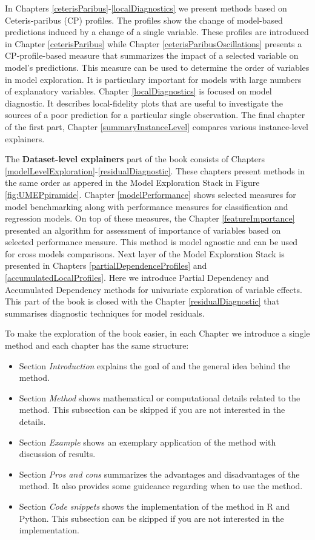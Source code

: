 \documentclass[12pt,]{krantz}
\providecommand{\tightlist}{%
  \setlength{\itemsep}{0pt}\setlength{\parskip}{0pt}}
\begin{document}
In Chapters \ref{ceterisParibus}-\ref{localDiagnostics} we present methods based on Ceteris-paribus (CP) profiles. The profiles show the change of model-based predictions induced by a change of a single variable. These profiles are introduced in Chapter \ref{ceterisParibus} while Chapter \ref{ceterisParibusOscillations} presents a CP-profile-based measure that summarizes the impact of a selected variable on model's predictions. This measure can be used to determine the order of variables in model exploration. It is particulary important for models with large numbers of explanatory variables. Chapter \ref{localDiagnostics} is focused on model diagnostic. It describes local-fidelity plots that are useful to investigate the sources of a poor prediction for a particular single observation.
The final chapter of the first part, Chapter \ref{summaryInstanceLevel} compares various instance-level explainers.

The \textbf{Dataset-level explainers} part of the book consists of Chapters \ref{modelLevelExploration}-\ref{residualDiagnostic}. These chapters present methods in the same order as appered in the Model Exploration Stack in Figure \ref{fig:UMEPpiramide}.
Chapter \ref{modelPerformance} shows selected measures for model benchmarking along with performance measures for classification and regression models.
On top of these measures, the Chapter \ref{featureImportance} presented an algorithm for assessment of importance of variables based on selected performance measure. This method is model agnostic and can be used for cross models comparisons.
Next layer of the Model Exploration Stack is presented in Chapters \ref{partialDependenceProfiles} and \ref{accumulatedLocalProfiles}. Here we introduce Partial Dependency and Accumulated Dependency methods for univariate exploration of variable effects.
This part of the book is closed with the Chapter \ref{residualDiagnostic} that summarises diagnostic techniques for model residuals.

To make the exploration of the book easier, in each Chapter we introduce a single method and each chapter has the same structure:

\begin{itemize}
\tightlist
\item
  Section \emph{Introduction} explains the goal of and the general idea behind the method.
\item
  Section \emph{Method} shows mathematical or computational details related to the method. This subsection can be skipped if you are not interested in the details.
\item
  Section \emph{Example} shows an exemplary application of the method with discussion of results.
\item
  Section \emph{Pros and cons} summarizes the advantages and disadvantages of the method. It also provides some guideance regarding when to use the method.
\item
  Section \emph{Code snippets} shows the implementation of the method in R and Python. This subsection can be skipped if you are not interested in the implementation.
\end{itemize}
\end{document}

